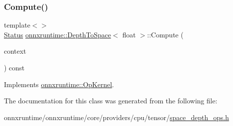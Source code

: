 \mbox{\label{classonnxruntime_1_1DepthToSpace_a8d233090f3988849495a1ae4f4c15745}} 
\subsubsection{\texorpdfstring{Compute()}{Compute()}\hspace{0.1cm}{\footnotesize\ttfamily [2/2]}}
{\footnotesize\ttfamily template$<$$>$ \\
\mbox{\hyperlink{classonnxruntime_1_1common_1_1Status}{Status}} \mbox{\hyperlink{classonnxruntime_1_1DepthToSpace}{onnxruntime\+::\+Depth\+To\+Space}}$<$ float $>$\+::Compute (\begin{DoxyParamCaption}\item[{\mbox{\hyperlink{classonnxruntime_1_1OpKernelContext}{Op\+Kernel\+Context}} $\ast$}]{context }\end{DoxyParamCaption}) const\hspace{0.3cm}{\ttfamily [virtual]}}



Implements \mbox{\hyperlink{classonnxruntime_1_1OpKernel_a9eca8656a78b1b3ab9d3351a12798650}{onnxruntime\+::\+Op\+Kernel}}.



The documentation for this class was generated from the following file\+:\begin{DoxyCompactItemize}
\item 
onnxruntime/onnxruntime/core/providers/cpu/tensor/\mbox{\hyperlink{space__depth__ops_8h}{space\+\_\+depth\+\_\+ops.\+h}}\end{DoxyCompactItemize}
